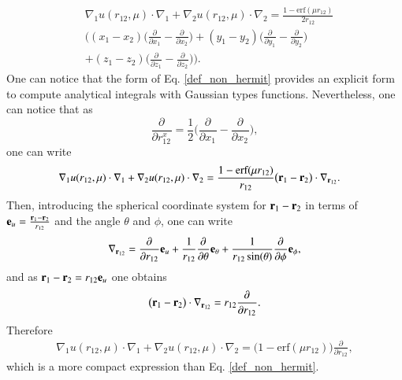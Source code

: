 \documentclass[aip,jcp,reprint,noshowkeys,superscriptaddress,twocolumn]{revtex4-1}
\newcommand{\deriv}[3]{\frac{\partial^{#3} #1}{\partial {#2}^{#3}}}
\newcommand{\br}[0]{{\bf {r}}}
\begin{document}
\begin{equation}
 \begin{aligned}
 \label{def_non_hermit}
& \nabla_1 u(r_{12},\mu) \cdot \nabla_1 + \nabla_2 u(r_{12},\mu) \cdot \nabla_2 = \frac{1 - \text{erf}(\mu r_{12})}{2 r_{12}} \\
& \bigg( (x_1 - x_2) \big( \deriv{}{x_1}{} - \deriv{}{x_2}{} \big) +
         (y_1 - y_2) \big( \deriv{}{y_1}{} - \deriv{}{y_2}{} \big)  \\
&  +      (z_1 - z_2) \big( \deriv{}{z_1}{} - \deriv{}{z_2}{} \big)\bigg).
 \end{aligned}
\end{equation}
One can notice that the form of Eq. \eqref{def_non_hermit} provides an explicit form to compute analytical integrals with Gaussian types functions. 
Nevertheless, one can notice that as 
\begin{equation}
 \deriv{}{r_{12}^x}{} = \frac{1}{2} \bigg( \deriv{}{x_1}{} - \deriv{}{x_2}{} \bigg),
\end{equation}
one can write 
\begin{equation}
 \begin{aligned}
 \label{eq:nabla_i_nabla0}
& \nabla_1 u(r_{12},\mu) \cdot \nabla_1 + \nabla_2 u(r_{12},\mu) \cdot \nabla_2 = \frac{1 - \text{erf}(\mu r_{12})}{r_{12}} \big( \br{}_1 - \br{}_2 \big) \cdot \nabla_{\br{}_{12}}.
 \end{aligned}
\end{equation}
Then, introducing the spherical coordinate system for $\br{}_1 - \br{}_2$ in terms of ${\bf e}_u= \frac{\br{}_1 - \br{}_2}{r_{12}}$ and the angle $\theta$ and $\phi$, one can write 
\begin{equation}
 \nabla_{\br{}_{12}} = \deriv{}{r_{12}}{} {\bf e}_u + \frac{1}{r_{12}} \deriv{}{\theta}{} {\bf e}_{\theta} + \frac{1}{r_{12} \sin(\theta)} \deriv{}{\phi}{} {\bf e}_\phi,
\end{equation}
and as $\br{}_1 - \br{}_2 = r_{12} {\bf e}_u$ one obtains
\begin{equation}
 \big( \br{}_1 - \br{}_2 \big) \cdot \nabla_{\br{}_{12}} = r_{12} \deriv{}{r_{12}}{}.
\end{equation}
Therefore 
\begin{equation}
 \begin{aligned}
 \label{eq:nabla_i_nabla1}
 \nabla_1 u(r_{12},\mu) \cdot \nabla_1 + \nabla_2 u(r_{12},\mu) \cdot \nabla_2 = \bigg( 1 - \text{erf}(\mu r_{12})\bigg) \deriv{}{r_{12}}{},
 \end{aligned}
\end{equation}
which is a more compact expression than Eq. \eqref{def_non_hermit}. 
\end{document}
